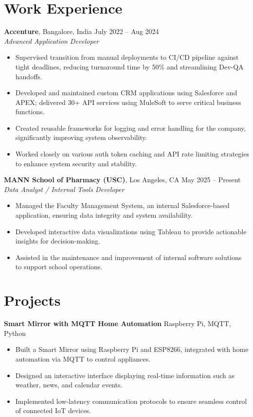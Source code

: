 \documentclass[letterpaper,10pt]{article}
\begin{document}
\section*{Work Experience}
\textbf{Accenture}, Bangalore, India \hfill July 2022 -- Aug 2024 \\
\textit{Advanced Application Developer}
\begin{itemize}[leftmargin=*,noitemsep,topsep=-3pt]
    \item Supervised transition from manual deployments to CI/CD pipeline against tight deadlines, reducing turnaround time by 50\% and streamlining Dev-QA handoffs.
    \item Developed and maintained custom CRM applications using Salesforce and APEX; delivered 30+ API services using MuleSoft to serve critical business functions.
    \item Created reusable frameworks for logging and error handling for the company, significantly improving system observability.
    \item Worked closely on various auth token caching and API rate limiting strategies to enhance system security and stability.

\end{itemize}

\textbf{MANN School of Pharmacy (USC)}, Los Angeles, CA \hfill May 2025 -- Present \\
\textit{Data Analyst / Internal Tools Developer}
\begin{itemize}[leftmargin=*,noitemsep,topsep=-3pt]
    \item Managed the Faculty Management System, an internal Salesforce-based application, ensuring data integrity and system availability.
    \item Developed interactive data visualizations using Tableau to provide actionable insights for decision-making.
    \item Assisted in the maintenance and improvement of internal software solutions to support school operations.
\end{itemize}

\section*{Projects}
\textbf{Smart Mirror with MQTT Home Automation} \hfill Raspberry Pi, MQTT, Python
\begin{itemize}[leftmargin=*,noitemsep,topsep=-3pt]
    \item Built a Smart Mirror using Raspberry Pi and ESP8266, integrated with home automation via MQTT to control appliances.
    \item Designed an interactive interface displaying real-time information such as weather, news, and calendar events.
    \item Implemented low-latency communication protocols to ensure seamless control of connected IoT devices.
\end{itemize}
\end{document}
